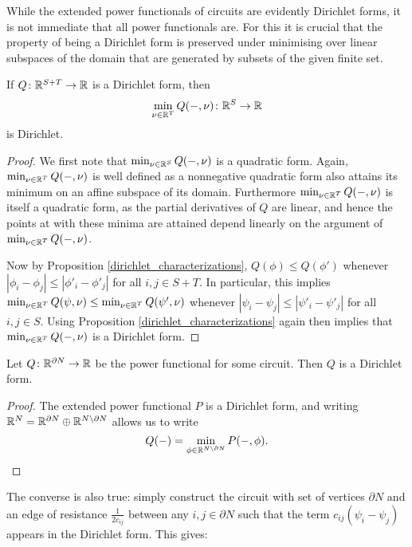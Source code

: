 While the extended power functionals of circuits are evidently Dirichlet forms,
it is not immediate that all power functionals are. For this it is crucial that
the property of being a Dirichlet form is preserved under minimising over linear
subspaces of the domain that are generated by subsets of the given finite set.

\begin{proposition} \label{dirichlet_minimization}
  If $Q{\colon} {\mathbb{R}}^{S+T} \to {\mathbb{R}}$ is a Dirichlet form, then 
  \[
    \min_{\nu \in {\mathbb{R}}^T} Q(-,\nu){\colon} {\mathbb{R}}^S \to {\mathbb{R}} 
  \]
  is Dirichlet.
\end{proposition}
\begin{proof}
  We first note that $\min_{\nu \in {\mathbb{R}}^S} Q(-,\nu)$ is a quadratic form. Again,
  $\min_{\nu \in {\mathbb{R}}^T} Q(-,\nu)$ is well defined as a nonnegative quadratic form
  also attains its minimum on an affine subspace of its domain. Furthermore
  $\min_{\nu \in {\mathbb{R}}^T} Q(-,\nu)$ is itself a quadratic form, as the partial
  derivatives of $Q$ are linear, and hence the points at with these minima are
  attained depend linearly on the argument of $\min_{\nu \in {\mathbb{R}}^T} Q(-,\nu)$.

  Now by Proposition \ref{dirichlet_characterizations}, $Q(\phi) \le Q(\phi')$
  whenever $|\phi_i - \phi_j| \le |\phi'_i - \phi'_j|$ for all $i,j \in S+T$. In
  particular, this implies $\min_{\nu \in {\mathbb{R}}^T} Q(\psi,\nu) \le \min_{\nu \in
  {\mathbb{R}}^T} Q(\psi',\nu)$ whenever $|\psi_i - \psi_j| \le |\psi'_i - \psi'_j|$ for
  all $i,j \in S$. Using Proposition \ref{dirichlet_characterizations} again
  then implies that $\min_{\nu \in {\mathbb{R}}^T} Q(-,\nu)$ is a Dirichlet form.
\end{proof}


\begin{corollary}
  Let $Q {\colon} {\mathbb{R}}^{\partial N} \to {\mathbb{R}}$ be the power functional for some circuit. Then
  $Q$ is a Dirichlet form.
\end{corollary}
\begin{proof}
  The extended power functional $P$ is a Dirichlet form, and writing ${\mathbb{R}}^N=
  {\mathbb{R}}^{\partial N} \oplus {\mathbb{R}}^{N \setminus \partial N}$ allows us to write
  \[
    Q(-) =  \min_{\phi\in {\mathbb{R}}^{N \setminus \partial N}}
    P(-,\phi). \qedhere
  \]
\end{proof}

The converse is also true: simply construct the circuit with set of vertices
$\partial N$ and an edge of resistance $\frac{1}{2c_{ij}}$ between any $i,j \in
\partial N$ such that the term $c_{ij}(\psi_i - \psi_j)$ appears in the
Dirichlet form. This gives: 

